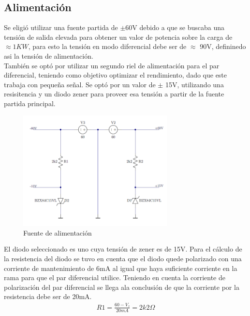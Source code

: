
\subsection{Alimentación}
Se eligió utilizar una fuente partida de $\pm$60V  debido a que se buscaba una tensión de salida elevada para obtener un valor de potencia sobre la carga de $\approx 1KW$, para esto la tensión en modo diferencial debe ser de $\approx$ 90V, defininedo asi la tensión de alimentación.\\
También se optó por utilizar un segundo riel de alimentación para el par diferencial, teniendo como objetivo optimizar el rendimiento, dado que este trabaja con pequeña señal. Se optó por un valor de $\pm$ 15V, utilizando una resisitencia y un diodo zener para proveer esa tensión a partir de la fuente partida principal.
\begin{figure}[H]
\centering
	\includegraphics[width=0.7\textwidth]{ImagenesAlimentacion/al.png}
	\caption{Fuente de alimentación}
	\label{fig:alimentacion}
\end{figure}
El diodo seleccionado es uno cuya tensión de zener es de 15V.
Para el cálculo de la resistencia del diodo se tuvo en cuenta que el diodo quede polarizado con una corriente de mantenimiento de 6mA al igual que haya suficiente corriente en la rama para que el par diferencial utilice. Teniendo en cuenta la corriente de polarización del par diferencial se llega  ala conclusión de que la corriente por la resistencia debe ser de 20mA.
\begin{align}
R1=\frac{60-V_z}{20mA}= 2k2\Omega
\end{align}
